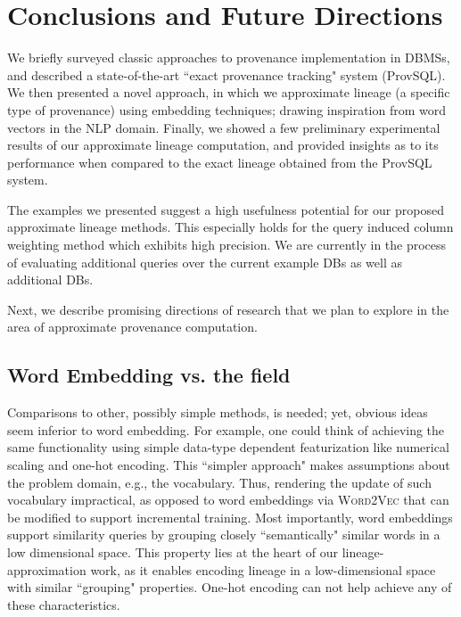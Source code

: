 \chapter{Conclusions and Future Directions}
\label{chap:conclusions}

We briefly surveyed classic approaches to provenance implementation in DBMSs, and described a state-of-the-art ``exact provenance tracking" system (ProvSQL). We then presented a novel approach, in which we approximate lineage (a specific type of provenance) using embedding techniques; drawing inspiration from word vectors in the NLP domain. Finally, we showed a few preliminary experimental results of our approximate lineage computation, and provided insights as to its performance when compared to the exact lineage obtained from the  ProvSQL system. 
\par The examples we presented suggest a high usefulness potential for our proposed approximate lineage methods.
This especially holds for the query induced column weighting method which exhibits high precision. We are currently in the process of evaluating additional queries over the current example DBs as well as additional DBs. 
\par Next, we describe promising directions of research that we plan to explore in the area of approximate provenance computation.

\section{Word Embedding vs. the field}
Comparisons to other, possibly simple methods, is needed; yet, obvious ideas seem inferior to word embedding. For example, one could think of achieving the same functionality using simple data-type dependent featurization like numerical scaling and one-hot encoding.
This ``simpler approach" makes assumptions about the problem domain, e.g., the vocabulary. Thus, rendering the update of such vocabulary impractical, as opposed to word embeddings via \textsc{Word2Vec} that can be modified to support incremental training.
Most importantly, word embeddings support similarity queries by grouping closely ``semantically" similar words in a low dimensional space. This property lies at the heart of our lineage-approximation work, as it enables encoding lineage in a low-dimensional space with similar ``grouping" properties. One-hot encoding can not help achieve any of these characteristics.

